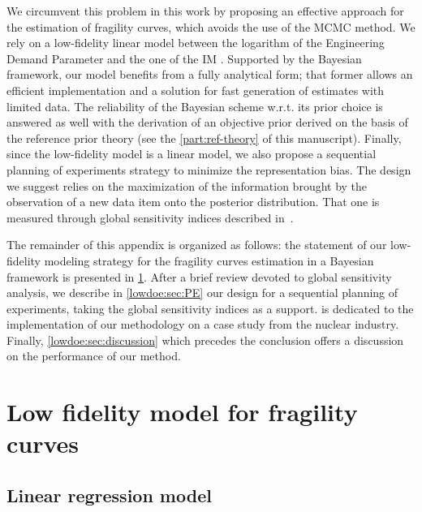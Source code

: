 We circumvent this problem in this work by proposing an effective approach for the estimation of fragility curves, which avoids the use of the MCMC method. We rely on a low-fidelity linear model between the logarithm of the Engineering Demand Parameter and the one of the IM \citep{lallemant_statistical_2015,hariri-ardebili_probabilistic_2016,zentner_fragility_2017,ghosh_seismic_2020}. Supported by the Bayesian framework, our model benefits from a fully analytical form; that former allows an efficient implementation and a solution for fast generation of estimates with limited data. The reliability of the Bayesian scheme w.r.t.{ }its prior choice is answered as well with the derivation of an objective prior derived on the basis of the reference prior theory (see the \cref{part:ref-theory} of this manuscript). Finally, since the low-fidelity model is a linear model, we also propose a sequential planning of experiments strategy to minimize the representation bias. 
The design we suggest relies on the maximization of the information brought by the observation of a new data item onto the posterior distribution. That one is measured through global sensitivity indices described in~\cite{da_veiga_global_2015}.


The remainder of this appendix is organized as follows:
the statement of our low-fidelity modeling strategy for the fragility curves estimation in a Bayesian framework is presented in \cref{lowdoe:sec:modeling}.
After a brief review devoted to global sensitivity analysis, we describe in \cref{lowdoe:sec:PE} our design for a sequential planning of experiments, taking the global sensitivity indices as a support.
 is dedicated to the implementation of our methodology on a case study from the nuclear industry. Finally, \cref{lowdoe:sec:discussion} which precedes the conclusion offers a discussion on the performance of our method.






\section{Low fidelity model for fragility curves}\label{lowdoe:sec:modeling}
    \subsection{Linear regression model}
    
